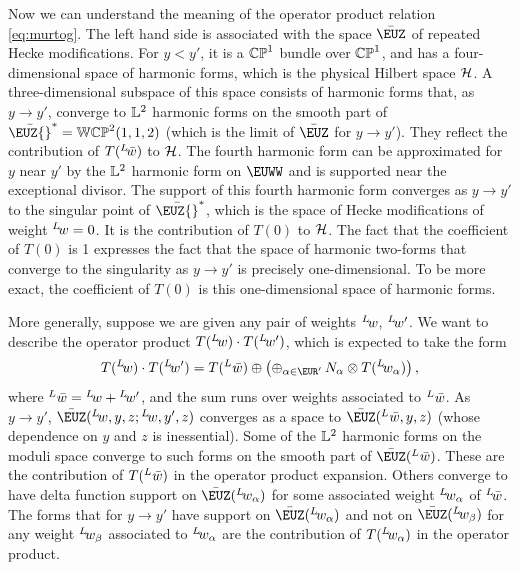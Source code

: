 Now we can understand the meaning of the operator product relation
\eqref{eq:murtog}.  The left hand side is associated with the space
$\bar\EUZ$ of repeated Hecke modifications.  For $y<y'$, it is a
$\Bbb{CP}^1$ bundle over $\Bbb{CP}^1$, and has a four-dimensional
space of harmonic forms, which is the physical Hilbert space
${\cal H}$.  A three-dimensional subspace of this space consists
of harmonic forms that, as $y\to y'$, converge to ${\Bbb{L}}^2$
harmonic forms on the smooth part of
$\bar\EUZ{}^*=\Bbb{WCP}^2(1,1,2)$ (which is the limit of
$\bar\EUZ$ for $y\to y'$). They reflect the contribution of
$T({}^L\negthinspace\bar w)$ to ${\cal H}$. The fourth harmonic
form can be approximated for $y$ near $y'$ by the $\Bbb{L}^2$
harmonic form on $\EUWW$ and is supported near the exceptional
divisor. The support of this fourth harmonic form converges as
$y\to y'$ to the singular point of $\bar\EUZ{}^*$, which is the
space of Hecke modifications of weight $^L\negthinspace w=0$. It
is the contribution of $T(0)$ to ${\cal H}$. The fact that the
coefficient of $T(0)$ is 1 expresses the fact that the space of
harmonic two-forms that converge to the singularity as $y\to y'$
is precisely one-dimensional.  To be more exact, the coefficient of $T(0)$ is
this one-dimensional space of harmonic forms.

More generally, suppose we are given any pair of weights
$^L\negthinspace w$, $^L\negthinspace w'$. We want to describe the
operator product $T({}^L\negthinspace w)\cdot T({}^L\negthinspace
w')$, which is expected to take the form
\setcounter{equation}{31}
\begin{equation}\label{eq:mitory}
T({}^L\negthinspace w)\cdot T({}^L\negthinspace
w')=T({}^L\negthinspace\,\bar w)\oplus\left(\oplus_{\alpha\in \EUR'}\,N_\alpha
\otimes T({}^L\negthinspace w_\alpha)\right),
\end{equation}
 where $^L\negthinspace\,\bar
w={}^L\negthinspace w+{}^L\negthinspace w'$, and the sum runs over
weights associated to $^L\negthinspace\,\bar w$.   As $y\to y'$,
$\bar\EUZ({}^L\negthinspace w,y,z;{}^L\negthinspace w,y',z)$
converges as a space to $\bar\EUZ({}^L\negthinspace\,\bar w,y,z)$
(whose dependence on $y$ and $z$ is inessential). Some of the
${\Bbb{L}}^2$ harmonic forms on the moduli space converge to such
forms on the smooth part of $\bar\EUZ({}^L\negthinspace\,\bar w)$.
These are the contribution of $T({}^L\negthinspace\,\bar w)$ in
the operator product expansion. Others converge to have delta
function support on $\bar\EUZ({}^L\negthinspace w_\alpha)$ for
some associated weight $^L\negthinspace w_\alpha$ of
$^L\negthinspace\bar w$.  The forms that for $y\to y'$ have
support on $\bar\EUZ({}^L\negthinspace w_\alpha)$ and not on
$\bar\EUZ({}^L\negthinspace w_\beta)$ for any weight
$^L\negthinspace w_\beta$ associated to $^L\negthinspace w_\alpha$
are the contribution of $T({}^L\negthinspace w_\alpha)$ in the
operator product.

